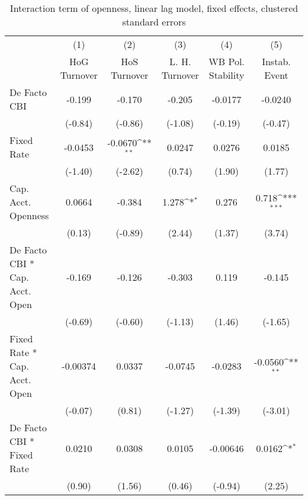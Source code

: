 {
\def\sym#1{\ifmmode^{#1}\else\(^{#1}\)\fi}
\begin{longtable}{l*{5}{c}}
\caption{Interaction term of openness, linear lag model, fixed effects, clustered standard errors \label{kapintlagsDF}}\\
\hline\hline\endfirsthead\hline\endhead\hline\endfoot\endlastfoot
                &\multicolumn{1}{c}{(1)}&\multicolumn{1}{c}{(2)}&\multicolumn{1}{c}{(3)}&\multicolumn{1}{c}{(4)}&\multicolumn{1}{c}{(5)}\\
                &\multicolumn{1}{c}{HoG Turnover}&\multicolumn{1}{c}{HoS Turnover}&\multicolumn{1}{c}{L. H. Turnover}&\multicolumn{1}{c}{WB Pol. Stability}&\multicolumn{1}{c}{Instab. Event}\\
\hline
De Facto CBI    &   -0.199         &   -0.170         &   -0.205         &  -0.0177         &  -0.0240         \\
                &  (-0.84)         &  (-0.86)         &  (-1.08)         &  (-0.19)         &  (-0.47)         \\
[1em]
Fixed Rate      &  -0.0453         &  -0.0670\sym{**} &   0.0247         &   0.0276         &   0.0185         \\
                &  (-1.40)         &  (-2.62)         &   (0.74)         &   (1.90)         &   (1.77)         \\
[1em]
Cap. Acct. Openness&   0.0664         &   -0.384         &    1.278\sym{*}  &    0.276         &    0.718\sym{***}\\
                &   (0.13)         &  (-0.89)         &   (2.44)         &   (1.37)         &   (3.74)         \\
[1em]
De Facto CBI * Cap. Acct. Open&   -0.169         &   -0.126         &   -0.303         &    0.119         &   -0.145         \\
                &  (-0.69)         &  (-0.60)         &  (-1.13)         &   (1.46)         &  (-1.65)         \\
[1em]
Fixed Rate * Cap. Acct. Open& -0.00374         &   0.0337         &  -0.0745         &  -0.0283         &  -0.0560\sym{**} \\
                &  (-0.07)         &   (0.81)         &  (-1.27)         &  (-1.39)         &  (-3.01)         \\
[1em]
De Facto CBI * Fixed Rate&   0.0210         &   0.0308         &   0.0105         & -0.00646         &   0.0162\sym{*}  \\
                &   (0.90)         &   (1.56)         &   (0.46)         &  (-0.94)         &   (2.25)         \\

\end{longtable}}
